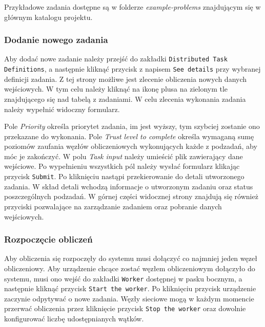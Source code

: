 \documentclass[a4paper,11pt,twoside]{report}
\theoremstyle{definition}
\begin{document}
        Przykładowe zadania dostępne są w folderze \textit{example-problems} znajdującym się w głównym katalogu projektu.
        
        
        \subsubsection{Dodanie nowego zadania}
        \label{distributed-task-add-guide}
        
        Aby dodać nowe zadanie należy przejść do zakładki \texttt{Distributed Task Definitions}, a następnie kliknąć przycisk z napisem \texttt{See details} przy wybranej definicji zadania.
        Z tej strony możliwe jest zlecenie obliczenia nowych danych wejściowych.
        W tym celu należy kliknąć na ikonę plusa na zielonym tle znajdującego się nad tabelą z zadaniami.
        W celu zlecenia wykonania zadania należy wypełnić widoczny formularz.
        
        Pole \textit{Priority} określa priorytet zadania, im jest wyższy, tym szybciej zostanie ono przekazane do wykonania.
        Pole \textit{Trust level to complete} określa wymaganą sumę poziomów zaufania węzłów obliczeniowych wykonujących każde z podzadań, aby móc je zakończyć. 
        W polu \textit{Task input} należy umieścić plik zawierający dane wejściowe.
        Po wypełnieniu wszystkich pól należy wysłać formularz klikając przycisk \texttt{Submit}. Po kliknięciu nastąpi przekierowanie do detali utworzonego zadania. 
        W skład detali wchodzą informacje o utworzonym zadaniu oraz status poszczególnych podzadań. W górnej części widocznej strony znajdują się również przyciski pozwalające na zarządzanie zadaniem oraz pobranie danych wejściowych.
        
        \subsubsection{Rozpoczęcie obliczeń}
        
        Aby obliczenia się rozpoczęły do systemu musi dołączyć co najmniej jeden węzeł obliczeniowy. Aby urządzenie chcące zostać węzłem obliczeniowym dołączyło do systemu, musi ono wejść do zakładki \texttt{Worker} dostępnej w pasku bocznym, a następnie kliknąć przycisk \texttt{Start the worker}.
        Po kliknięciu przycisk urządzenie zaczynie odpytywać o nowe zadania.
        Węzły sieciowe mogą w każdym momencie przerwać obliczenia przez kliknięcie przycisk \texttt{Stop the worker} oraz dowolnie konfigurować liczbę udostępnianych wątków. 
        
\end{document}
